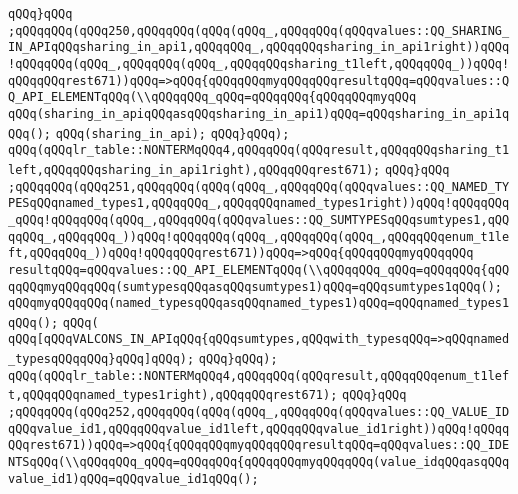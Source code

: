 \verb|qQQq}qQQq|\newline
\verb|;qQQqqQQq(qQQq250,qQQqqQQq(qQQq(qQQq_,qQQqqQQq(qQQqvalues::QQ_SHARING_IN_APIqQQqsharing_in_api1,qQQqqQQq_,qQQqqQQqsharing_in_api1right))qQQq!qQQqqQQq(qQQq_,qQQqqQQq(qQQq_,qQQqqQQqsharing_t1left,qQQqqQQq_))qQQq!qQQqqQQqrest671))qQQq=>qQQq{qQQqqQQqmyqQQqqQQqresultqQQq=qQQqvalues::QQ_API_ELEMENTqQQq(\\qQQqqQQq_qQQq=qQQqqQQq{qQQqqQQqmyqQQq|\newline
\verb|qQQq(sharing_in_apiqQQqasqQQqsharing_in_api1)qQQq=qQQqsharing_in_api1qQQq();|\newline
\verb|qQQq(sharing_in_api);|\newline
\verb|qQQq}qQQq);|\newline
\verb|qQQq(qQQqlr_table::NONTERMqQQq4,qQQqqQQq(qQQqresult,qQQqqQQqsharing_t1left,qQQqqQQqsharing_in_api1right),qQQqqQQqrest671);|\newline
\verb|qQQq}qQQq|\newline
\verb|;qQQqqQQq(qQQq251,qQQqqQQq(qQQq(qQQq_,qQQqqQQq(qQQqvalues::QQ_NAMED_TYPESqQQqnamed_types1,qQQqqQQq_,qQQqqQQqnamed_types1right))qQQq!qQQqqQQq_qQQq!qQQqqQQq(qQQq_,qQQqqQQq(qQQqvalues::QQ_SUMTYPESqQQqsumtypes1,qQQqqQQq_,qQQqqQQq_))qQQq!qQQqqQQq(qQQq_,qQQqqQQq(qQQq_,qQQqqQQqenum_t1left,qQQqqQQq_))qQQq!qQQqqQQqrest671))qQQq=>qQQq{qQQqqQQqmyqQQqqQQq|\newline
\verb|resultqQQq=qQQqvalues::QQ_API_ELEMENTqQQq(\\qQQqqQQq_qQQq=qQQqqQQq{qQQqqQQqmyqQQqqQQq(sumtypesqQQqasqQQqsumtypes1)qQQq=qQQqsumtypes1qQQq();|\newline
\verb|qQQqmyqQQqqQQq(named_typesqQQqasqQQqnamed_types1)qQQq=qQQqnamed_types1qQQq();|\newline
\verb|qQQq(|\newline
\verb|qQQq[qQQqVALCONS_IN_APIqQQq{qQQqsumtypes,qQQqwith_typesqQQq=>qQQqnamed_typesqQQqqQQq}qQQq]qQQq);|\newline
\verb|qQQq}qQQq);|\newline
\verb|qQQq(qQQqlr_table::NONTERMqQQq4,qQQqqQQq(qQQqresult,qQQqqQQqenum_t1left,qQQqqQQqnamed_types1right),qQQqqQQqrest671);|\newline
\verb|qQQq}qQQq|\newline
\verb|;qQQqqQQq(qQQq252,qQQqqQQq(qQQq(qQQq_,qQQqqQQq(qQQqvalues::QQ_VALUE_IDqQQqvalue_id1,qQQqqQQqvalue_id1left,qQQqqQQqvalue_id1right))qQQq!qQQqqQQqrest671))qQQq=>qQQq{qQQqqQQqmyqQQqqQQqresultqQQq=qQQqvalues::QQ_IDENTSqQQq(\\qQQqqQQq_qQQq=qQQqqQQq{qQQqqQQqmyqQQqqQQq(value_idqQQqasqQQqvalue_id1)qQQq=qQQqvalue_id1qQQq();|\newline
